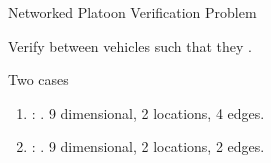 \begin{frame}{Networked Platoon Verification Problem}
\begin{alertblock}{}
Verify  between vehicles such that they .
\end{alertblock}
%
\begin{exampleblock}{Two cases}
\begin{enumerate}
\item {}: . {\color{violet} 9 dimensional, 2 locations, 4 edges}.
\item {}: . {\color{violet} 9 dimensional, 2 locations, 2 edges}.
\end{enumerate}
\end{exampleblock}
\end{frame}

